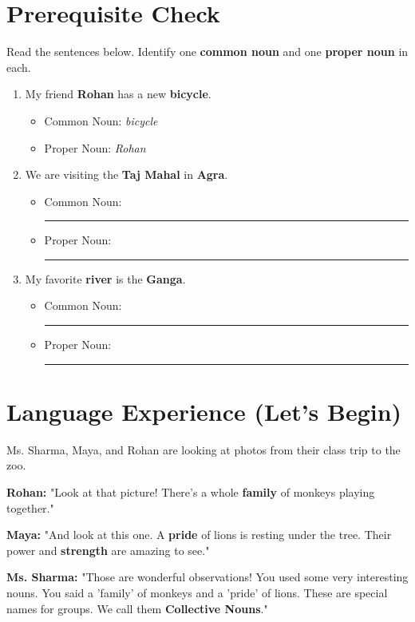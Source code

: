 \section{Prerequisite Check}
\begin{quickcheck}
Read the sentences below. Identify one \textbf{common noun} and one \textbf{proper noun} in each.

\begin{enumerate}
    \item My friend \textbf{Rohan} has a new \textbf{bicycle}.
    \begin{itemize}
        \item Common Noun: \textit{bicycle}
        \item Proper Noun: \textit{Rohan}
    \end{itemize}
    \item We are visiting the \textbf{Taj Mahal} in \textbf{Agra}.
    \begin{itemize}
        \item Common Noun: \rule{3cm}{0.4pt}
        \item Proper Noun: \rule{3cm}{0.4pt}
    \end{itemize}
    \item My favorite \textbf{river} is the \textbf{Ganga}.
    \begin{itemize}
        \item Common Noun: \rule{3cm}{0.4pt}
        \item Proper Noun: \rule{3cm}{0.4pt}
    \end{itemize}
\end{enumerate}
\end{quickcheck}

\section{Language Experience (Let's Begin)}
Ms. Sharma, Maya, and Rohan are looking at photos from their class trip to the zoo.

\textbf{Rohan:} "Look at that picture! There's a whole \textbf{family} of monkeys playing together."

\textbf{Maya:} "And look at this one. A \textbf{pride} of lions is resting under the tree. Their power and \textbf{strength} are amazing to see."

\textbf{Ms. Sharma:} "Those are wonderful observations! You used some very interesting nouns. You said a 'family' of monkeys and a 'pride' of lions. These are special names for groups. We call them \textbf{Collective Nouns}."

